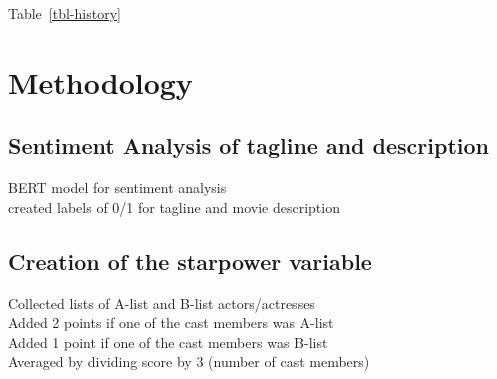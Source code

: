 \documentclass[
]{agujournal2019}
\begin{document}
Table~\ref{tbl-history}

\section{Methodology}\label{sec-meth}

\subsection{Sentiment Analysis of tagline and
description}\label{sentiment-analysis-of-tagline-and-description}

BERT model for sentiment analysis\\
created labels of 0/1 for tagline and movie description

\subsection{Creation of the starpower
variable}\label{creation-of-the-starpower-variable}

Collected lists of A-list and B-list actors/actresses\\
Added 2 points if one of the cast members was A-list\\
Added 1 point if one of the cast members was B-list\\
Averaged by dividing score by 3 (number of cast members)
\end{document}
